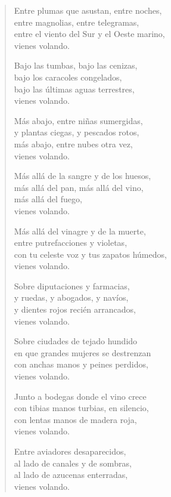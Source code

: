 \documentclass[12pt]{article}
\begin{document}
\clearpage
{}
\begin{verse}

Entre plumas que asustan, entre noches,\\
entre magnolias, entre telegramas,\\
entre el viento del Sur y el Oeste marino,\\
vienes volando.  

Bajo las tumbas, bajo las cenizas,\\
bajo los caracoles congelados,\\
bajo las últimas aguas terrestres,\\
vienes volando.  

Más abajo, entre niñas sumergidas,\\
y plantas ciegas, y pescados rotos,\\
más abajo, entre nubes otra vez,\\
vienes volando.  

Más allá de la sangre y de los huesos,\\
más allá del pan, más allá del vino,\\
más allá del fuego,\\
vienes volando.  

Más allá del vinagre y de la muerte,\\
entre putrefacciones y violetas,\\
con tu celeste voz y tus zapatos húmedos,\\
vienes volando.  

Sobre diputaciones y farmacias,\\
y ruedas, y abogados, y navíos,\\
y dientes rojos recién arrancados,\\
vienes volando.  

Sobre ciudades de tejado hundido\\
en que grandes mujeres se destrenzan\\
con anchas manos y peines perdidos,\\
vienes volando.  

Junto a bodegas donde el vino crece\\
con tibias manos turbias, en silencio,\\
con lentas manos de madera roja,\\
vienes volando.  

Entre aviadores desaparecidos,\\
al lado de canales y de sombras,\\
al lado de azucenas enterradas,\\
vienes volando.  


\end{verse}
\end{document}
